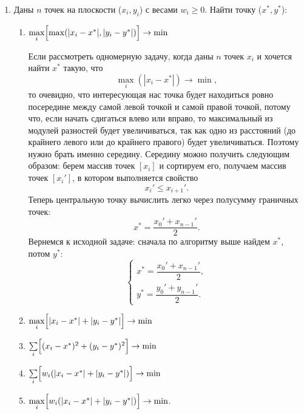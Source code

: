 \begin{enumerate}
  \item
    Даны $n$ точек на плоскости ($x_i, y_i$) с весами $w_i \ge 0$. Найти точку ($x^{*}, y^{*}$):
    \begin{enumerate}
      \item {} $\max\limits_i \Bigl[ \max(|x_i-x^{*}|, |y_i-y^{*}|) \Bigr] \rightarrow \min$
      \begin{solution}
        Если рассмотреть одномерную задачу, когда даны $n$ точек $x_i$ и хочется найти $x^{*}$ такую, что
        \begin{equation}
          \max\limits_i(|x_i-x^{*}|) \rightarrow \min,
        \end{equation}
        то очевидно, что интересующая нас точка будет находиться ровно посередине между самой левой точкой и самой правой точкой, потому что, если начать сдигаться влево или вправо, то максимальный из модулей разностей будет увеличиваться, так как одно из расстояний (до крайнего левого или до крайнего правого) будет увеличиваться. Поэтому нужно брать именно середину. Середину можно получить следующим образом: берем массив точек $[x_i]$ и сортируем его, получаем массив точек $[x_i']$, в котором выполняется свойство
        \begin{equation}
          x_{i}' \leq x_{i+1}'.
        \end{equation}
        Теперь центральную точку вычислить легко через полусумму граничных точек:
        \begin{equation}
          x^{*} = \frac{x_{0}' + x_{n-1}'}{2}.
        \end{equation}
        Вернемся к исходной задаче: сначала по алгоритму выше найдем $x^{*}$, потом $y^{*}$:
        \begin{equation}
          \begin{cases}
            x^{*} = \dfrac{x_{0}' + x_{n-1}'}{2}, \\
            y^{*} = \dfrac{y_{0}' + y_{n-1}'}{2}.
          \end{cases}
        \end{equation}
      \end{solution}
      \item {} $\max\limits_i \Bigl[ |x_i-x^{*}|+|y_i-y^{*}|  \Bigr] \rightarrow \min$
      \item {} $\sum\limits_i \Bigl[ (x_i-x^{*})^2+(y_i-y^{*})^2  \Bigr] \rightarrow \min$
      \item $\sum\limits_i \Bigl[ w_i(|x_i-x^{*}|+|y_i-y^{*}|) \Bigr] \rightarrow \min$
      \item $\max\limits_i \Bigl[ w_i(|x_i-x^{*}|+|y_i-y^{*}|) \Bigr] \rightarrow \min$.
    \end{enumerate}


\end{enumerate}
